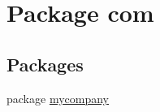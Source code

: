 \hypertarget{namespacecom}{}\section{Package com}
\label{namespacecom}
\subsection*{Packages}
\begin{DoxyCompactItemize}
\item 
package \hyperlink{namespacecom_1_1mycompany}{mycompany}
\end{DoxyCompactItemize}
